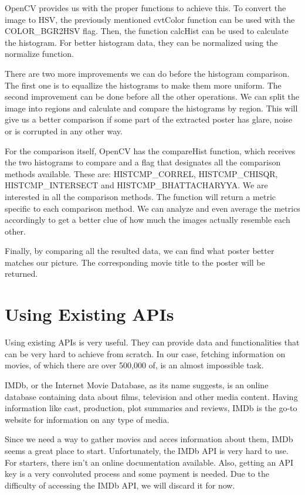 \documentclass[12pt,a4paper,twoside]{report}
\begin{document}
OpenCV provides us with the proper functions to achieve this. To convert the image to HSV, the previously mentioned cvtColor function can be used with the COLOR\_BGR2HSV flag. Then, the function calcHist can be used to calculate the histogram. For better histogram data, they can be normalized using the normalize function.

There are two more improvements we can do before the histogram comparison. The first one is to equallize the histograms to make them more uniform. The second improvement can be done before all the other operations. We can split the image into regions and calculate and compare the histograms by region. This will give us a better comparison if some part of the extracted poster has glare, noise or is corrupted in any other way.

For the comparison itself, OpenCV has the compareHist function, which receives the two histograms to compare and a flag that designates all the comparison methods available. These are: HISTCMP\_CORREL, HISTCMP\_CHISQR, HISTCMP\_INTERSECT and HISTCMP\_BHATTACHARYYA. We are interested in all the comparison methods. The function will return a metric specific to each comparison method. We can analyze and even average the metrics accordingly to get a better clue of how much the images actually resemble each other.

Finally, by comparing all the resulted data, we can find what poster better matches our picture. The corresponding movie title to the poster will be returned.


\section{Using Existing APIs}
Using existing APIs is very useful. They can provide data and functionalities that can be very hard to achieve from scratch. In our case, fetching information on movies, of which there are over 500,000 of, is an almost impossible task. 

IMDb, or the Internet Movie Database, as its name suggests, is an online database containing data about films, television and other media content. Having information like cast, production, plot summaries and reviews, IMDb is the go-to website for information on any type of media.

Since we need a way to gather movies and acces information about them, IMDb seems a great place to start. Unfortunately, the IMDb API is very hard to use. For starters, there isn't an online documentation available. Also, getting an API key is a very convoluted process and some payment is needed. Due to the difficulty of accessing the IMDb API, we will discard it for now. 
\end{document}
